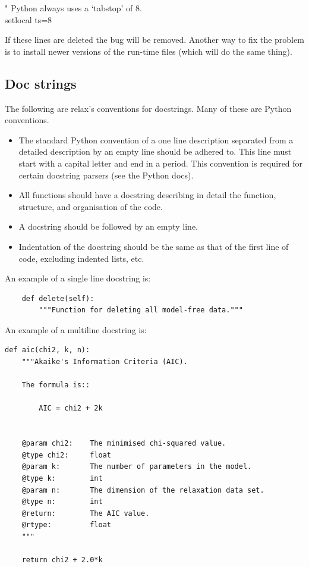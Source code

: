 \begin{exampleenv}
" Python always uses a `tabstop' of 8. \\
setlocal ts=8
\end{exampleenv}

If these lines are deleted the bug will be removed.
Another way to fix the problem is to install newer versions of the run-time files (which will do the same thing).



\subsection{Doc strings}

The following are relax's conventions for docstrings.
Many of these are Python conventions.
\begin{itemize}
  \item The standard Python convention of a one line description separated from a detailed description by an empty line should be adhered to.
    This line must start with a capital letter and end in a period.
    This convention is required for certain docstring parsers (see the Python docs).
  \item All functions should have a docstring describing in detail the function, structure, and organisation of the code.
  \item A docstring should be followed by an empty line.
  \item Indentation of the docstring should be the same as that of the first line of code, excluding indented lists, etc.
\end{itemize}

An example of a single line docstring is:

\begin{lstlisting}
    def delete(self):
        """Function for deleting all model-free data."""
\end{lstlisting}

An example of a multiline docstring is:

\begin{lstlisting}
def aic(chi2, k, n):
    """Akaike's Information Criteria (AIC).

    The formula is::

        AIC = chi2 + 2k


    @param chi2:    The minimised chi-squared value.
    @type chi2:     float
    @param k:       The number of parameters in the model.
    @type k:        int
    @param n:       The dimension of the relaxation data set.
    @type n:        int
    @return:        The AIC value.
    @rtype:         float
    """

    return chi2 + 2.0*k
\end{lstlisting}

